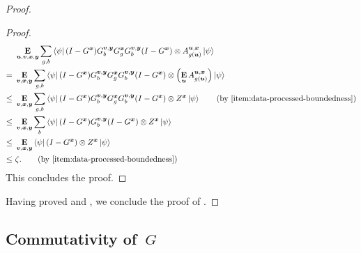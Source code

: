 \begin{proof}
\begin{proof}
	\begin{align*}
	&\E_{\bu,\bv,\bx,\by} \sum_{g,b} \bra{\psi}(I-G^{\bx}) G^{\bv,\by}_b G^{\bx}_g  G^{\bv,\by}_b (I-G^{\bx})  \ot  A^{\bu,\bx}_{g(\bu)}\ket{\psi}\\
	=~&\E_{\bv,\bx,\by} \sum_{g,b} \bra{\psi}(I-G^{\bx}) G^{\bv,\by}_b G^{\bx}_g  G^{\bv,\by}_b (I-G^{\bx})  \ot  \left(\E_{\bu} A^{\bu,\bx}_{g(\bu)}\right)\ket{\psi}\\
	\leq~&\E_{\bv,\bx,\by} \sum_{g,b} \bra{\psi}(I-G^{\bx}) G^{\bv,\by}_b G^{\bx}_g  G^{\bv,\by}_b (I-G^{\bx})  \ot  Z^{\bx}\ket{\psi}\tag{by~\Cref{item:data-processed-boundedness}}\\
	\leq~&\E_{\bv,\bx,\by} \sum_{b} \bra{\psi}(I-G^{\bx}) G^{\bv,\by}_b  (I-G^{\bx})  \ot  Z^{\bx}\ket{\psi}\\
	\leq~&\E_{\bv,\bx,\by} \bra{\psi}(I-G^{\bx})  \ot  Z^{\bx}\ket{\psi}\\
	\leq~&\zeta.\tag{by~\Cref{item:data-processed-boundedness}}
	\end{align*}
	This concludes the proof.
	\end{proof}
Having proved  and , we conclude the proof of .
\end{proof}

\subsection{Commutativity of~$G$}\label{sec:G-commutes}

